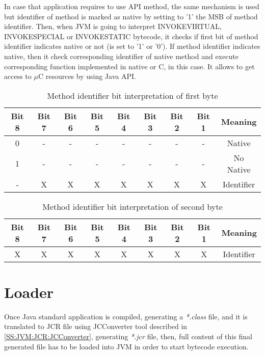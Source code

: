 In case that application requires to use API method, the same mechanism is used but identifier of method is marked as native by setting to '1' the MSB of method identifier. Then, when JVM is going to interpret INVOKEVIRTUAL, INVOKESPECIAL or INVOKESTATIC bytecode, it checks if first bit of method identifier indicates native or not (is set to '1' or '0'). If method identifier indicates native, then it check corresponding identifier of native method and execute corresponding function implemented in native or C, in this case. It allows to get access to $\mu$C resources by using Java API.

\begin{table}[!htb]
\centering
\begin{tabular}{|c|c|c|c|c|c|c|c|c|}
\hline 
Bit 8 & Bit 7 & Bit 6 & Bit 5 & Bit 4 & Bit 3 & Bit 2 & Bit 1 & Meaning \\ 
\hline 
0 & - & - & - & - & - & - & - & Native \\ 
\hline 
1 & - & - & - & - & - & - & - & No Native \\ 
\hline 
- & X & X & X & X & X & X & X & Identifier \\ 
\hline 
\end{tabular}
\caption{Method identifier bit interpretation of first byte}
\label{tab:SS:JVM:JCR:TransBytecodes}
\end{table}

\begin{table}[!htb]
\centering
\begin{tabular}{|c|c|c|c|c|c|c|c|c|}
\hline 
Bit 8 & Bit 7 & Bit 6 & Bit 5 & Bit 4 & Bit 3 & Bit 2 & Bit 1 & Meaning \\ 
\hline 
X & X & X & X & X & X & X & X & Identifier \\ 
\hline 
\end{tabular}
\caption{Method identifier bit interpretation of second byte}
\label{tab:SS:JVM:JCR:TransBytecodes}
\end{table}

\section{Loader}\label{S:JVM:Loader}
Once Java standard application is compiled, generating a \textit{*.class} file, and it is translated to JCR file using JCConverter tool described in \ref{SS:JVM:JCR:JCConverter}, generating \textit{*.jcr} file, then, full content of this final generated file has to be loaded into JVM in order to start bytecode execution.

